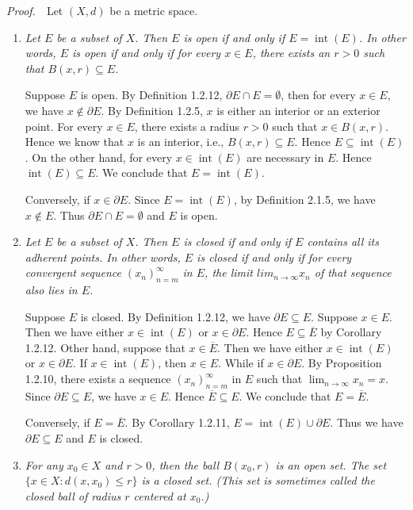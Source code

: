 \documentclass{book}
\DeclareMathOperator{\inte}{int}%
\newcommand{\pff}{\vspace{.25em}\noindent\emph{Proof.}~~}
\begin{document}
\pff Let $(X,d)$ be a metric space.
\begin{enumerate}
    \item \emph{Let $E$ be a subset of $X$. Then $E$ is open if and only if $E=\inte(E)$. In other words, $E$ is open if and only if for every $x\in E$, there exists an $r>0$ such that $B(x,r)\subseteq E$.}

    Suppose $E$ is open. By Definition 1.2.12, $\partial E\cap E=\emptyset$, then for every $x\in E$, we have $x\notin\partial E$. By Definition 1.2.5, $x$ is either an interior or an exterior point. For every $x\in E$, there exists a radius $r>0$ such that $x\in B(x,r)$. Hence we know that $x$ is an interior, i.e., $B(x,r)\subseteq E$. Hence $E\subseteq\inte(E)$. On the other hand, for every $x\in\inte(E)$ are necessary in $E$. Hence $\inte(E)\subseteq E$. We conclude that $E=\inte(E)$.

    Conversely, if $x\in\partial E$. Since $E=\inte(E)$, by Definition 2.1.5, we have $x\notin E$. Thus $\partial E\cap E=\emptyset$ and $E$ is open.

    \item \emph{Let $E$ be a subset of $X$. Then $E$ is closed if and only if $E$ contains all its adherent points. In other words, $E$ is closed if and only if for every convergent sequence $(x_n)_{n=m}^{\infty}$ in $E$, the limit $lim_{n\to\infty}x_n$ of that sequence also lies in $E$.}
    
    Suppose $E$ is closed. By Definition 1.2.12, we have $\partial E\subseteq E$. Suppose $x\in E$. Then we have either $x\in\inte(E)$ or $x\in\partial E$. Hence $E\subseteq\overline E$ by Corollary 1.2.12. Other hand, suppose that $x\in\overline E$. Then we have either $x\in\inte(E)$ or $x\in\partial E$. If $x\in\inte(E)$, then $x\in E$. While if $x\in\partial E$. By Proposition 1.2.10, there exists a sequence $(x_n)_{n=m}^{\infty}$ in $E$ such that $\lim_{n\to\infty}x_n=x$. Since $\partial E\subseteq E$, we have $x\in E$. Hence $\overline E\subseteq E$. We conclude that $E=\overline E$.

    Conversely, if $E=\overline E$. By Corollary 1.2.11, $E=\inte(E)\cup\partial E$. Thus we have $\partial E\subseteq E$ and $E$ is closed.

    \item \emph{For any $x_0\in X$ and $r>0$, then the ball $B(x_0,r)$ is an open set. The set $\{x\in X:d(x,x_0)\leq r\}$ is a closed set. (This set is sometimes called the closed ball of radius $r$ centered at $x_0$.)}


\end{enumerate}
\end{document}
